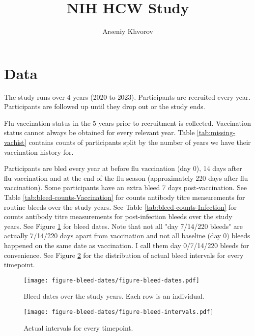 \documentclass[12pt]{article}
\title{NIH HCW Study}
\author{Arseniy Khvorov}
\begin{document}
\maketitle

\section{Data}

The study runs over 4 years (2020 to 2023).
Participants are recruited every year.
Participants are followed up until they drop out or the study ends.

Flu vaccination status in the 5 years prior to recruitment is collected. Vaccination status cannot always be obtained for every relevant year. Table \ref{tab:missing-vachist} contains counts of participants split by the number of years we have their vaccination history for.



Participants are bled every year at before flu vaccination (day 0), 14 days after flu vaccination and at the end of the flu season (approximately 220 days after flu vaccination).
Some participants have an extra bleed 7 days post-vaccination.
See Table \ref{tab:bleed-counts-Vaccination} for counts antibody titre measurements for routine bleeds over the study years.
See Table \ref{tab:bleed-counts-Infection} for counts antibody titre measurements for post-infection bleeds over the study years.
See Figure \ref{fig:bleed-dates} for bleed dates.
Note that not all "day 7/14/220 bleeds" are actually 7/14/220 days apart from vaccination and not all baseline (day 0) bleeds happened on the same date as vaccination.
I call them day 0/7/14/220 bleeds for convenience.
See Figure \ref{fig:bleed-intervals} for the distribution of actual bleed intervals for every timepoint.




\begin{figure}
	\texttt{[image: figure-bleed-dates/figure-bleed-dates.pdf]}
	\caption{Bleed dates over the study years. Each row is an individual.}
	\label{fig:bleed-dates}
\end{figure}

\begin{figure}
	\texttt{[image: figure-bleed-dates/figure-bleed-intervals.pdf]}
	\caption{Actual intervals for every timepoint.}
	\label{fig:bleed-intervals}
\end{figure}
\end{document}
